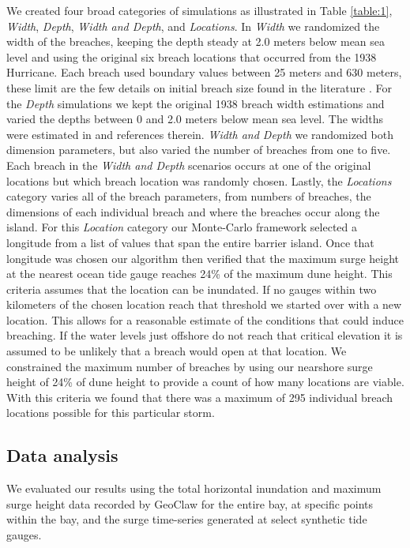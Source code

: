 \documentclass{coastal_paper}
\begin{document}
We created four broad categories of simulations as illustrated in Table \ref{table:1}, \emph{Width}, \emph{Depth}, \emph{Width and Depth}, and \emph{Locations}. In \emph{Width} we randomized the width of the breaches, keeping the depth steady at 2.0 meters below mean sea level and using the original six breach locations that occurred from the 1938 Hurricane. Each breach used boundary values between 25 meters and 630 meters, these limit are the few details on initial breach size found in the literature \citep{schmeltz1982breach, kraus2003coastal,visser1999breach, canizares2008simulation}. For the \emph{Depth} simulations we kept the original 1938 breach width estimations and varied the depths between 0 and 2.0 meters below mean sea level. The widths were estimated in \citet{canizares2008simulation} and references therein. \emph{Width and Depth} we randomized both dimension parameters, but also varied the number of breaches from one to five. Each breach in the \emph{Width and Depth} scenarios occurs at one of the original locations but which breach location was randomly chosen. Lastly, the \emph{Locations} category varies all of the breach parameters, from numbers of breaches, the dimensions of each individual breach and where the breaches occur along the island. For this \emph{Location} category our Monte-Carlo framework selected a longitude from a list of values that span the entire barrier island. Once that longitude was chosen our algorithm then verified that the maximum surge height at the nearest ocean tide gauge reaches 24\% of the maximum dune height. This criteria assumes that the location can be inundated. If no gauges within two kilometers of the chosen location reach that threshold we started over with a new location. This allows for a reasonable estimate of the conditions that could induce breaching. If the water levels just offshore do not reach that critical elevation it is assumed to be unlikely that a breach would open at that location. We constrained the maximum number of breaches by using our nearshore surge height of 24\% of dune height to provide a count of how many locations are viable. With this criteria we found that there was a maximum of 295 individual breach locations possible for this particular storm.

\subsection{Data analysis}
We evaluated our results using the total horizontal inundation and maximum surge height data recorded by GeoClaw for the entire bay, at specific points within the bay, and the surge time-series generated at select synthetic tide gauges.
\end{document}
